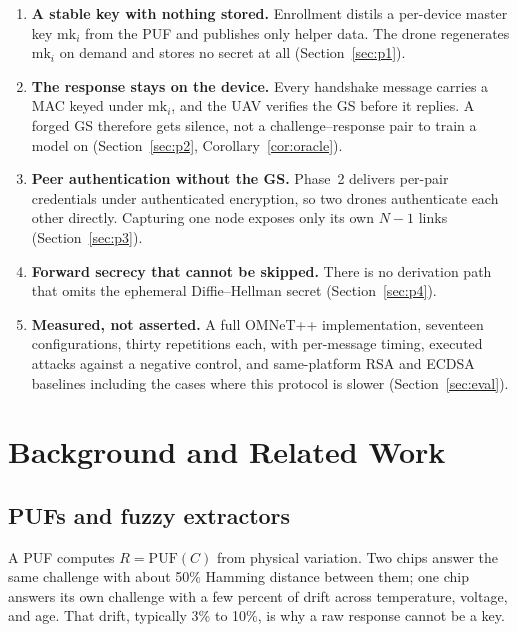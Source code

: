\documentclass[conference]{IEEEtran}
\begin{document}
\begin{enumerate}
\item \textbf{A stable key with nothing stored.} Enrollment distils a per-device
master key $\text{mk}_i$ from the PUF and publishes only helper data. The drone
regenerates $\text{mk}_i$ on demand and stores no secret at all
(Section~\ref{sec:p1}).

\item \textbf{The response stays on the device.} Every handshake message carries
a MAC keyed under $\text{mk}_i$, and the UAV verifies the GS before it replies.
A forged GS therefore gets silence, not a challenge--response pair to train a
model on (Section~\ref{sec:p2}, Corollary~\ref{cor:oracle}).

\item \textbf{Peer authentication without the GS.} Phase~2 delivers per-pair
credentials under authenticated encryption, so two drones authenticate each
other directly. Capturing one node exposes only its own $N-1$ links
(Section~\ref{sec:p3}).

\item \textbf{Forward secrecy that cannot be skipped.} There is no derivation
path that omits the ephemeral Diffie--Hellman secret (Section~\ref{sec:p4}).

\item \textbf{Measured, not asserted.} A full OMNeT++ implementation, seventeen
configurations, thirty repetitions each, with per-message timing, executed
attacks against a negative control, and same-platform RSA and ECDSA baselines
including the cases where this protocol is slower
(Section~\ref{sec:eval}).
\end{enumerate}

\section{Background and Related Work}
\label{sec:related}

\subsection{PUFs and fuzzy extractors}

A PUF computes $R = \mathrm{PUF}(C)$ from physical variation. Two chips answer
the same challenge with about 50\% Hamming distance between them; one chip
answers its own challenge with a few percent of drift across temperature,
voltage, and age. That drift, typically 3\% to 10\%, is why a raw response
cannot be a key.
\end{document}
